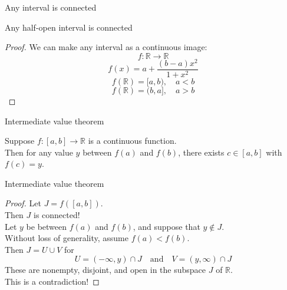 \documentclass{beamer}
\begin{document}
\begin{frame}{Any interval is connected}
\begin{thm}
Any half-open interval is connected
\end{thm}
\pause
\begin{proof}
\pause
We can make any interval as a continuous image:
$$f:\mathbb{R}\rightarrow\mathbb{R}$$
$$f(x) = a + \frac{(b-a)x^2}{1+x^2}$$
\pause
$$f(\mathbb{R}) = [a,b),\quad a < b$$
\pause
$$f(\mathbb{R}) = (b,a],\quad a > b$$
\end{proof}
\end{frame}

\begin{frame}{Intermediate value theorem}
\begin{thm}
Suppose $f: [a,b]\rightarrow\mathbb{R}$ is a continuous function.\\
Then for any value $y$ between $f(a)$ and $f(b)$, there exists $c\in [a,b]$ with $f(c) =y$.
\end{thm}
\end{frame}

\begin{frame}{Intermediate value theorem}
\begin{proof}
\pause
Let $J = f([a,b])$.\\
\pause
Then $J$ is connected!\\
\pause
Let $y$ be between $f(a)$ and $f(b)$, and suppose that $y\notin J$.\\
\pause
Without loss of generality, assume $f(a) < f(b)$.\\
\pause
Then $J = U\cup V$ for
$$U = (-\infty,y)\cap J\quad\text{and}\quad V = (y,\infty)\cap J$$
\pause
These are nonempty, disjoint, and open in the subspace $J$ of $\mathbb{R}$.\\
\pause
This is a contradiction!
\end{proof}
\end{frame}
\end{document}
